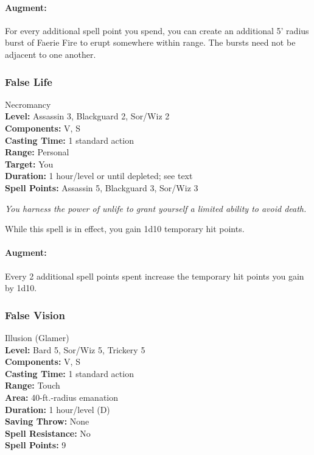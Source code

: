 \paragraph{Augment:} For every additional spell point you spend, you can create an additional 5' radius burst of Faerie Fire to erupt somewhere within range. The bursts need not be adjacent to one another.
\subsubsection{False Life}
\label{Spell:FalseLife}
Necromancy
\\ \textbf{Level:} Assassin 3, Blackguard 2, Sor/Wiz 2
\\ \textbf{Components:} V, S
\\ \textbf{Casting Time:} 1 standard action
\\ \textbf{Range:} Personal
\\ \textbf{Target:} You
\\ \textbf{Duration:} 1 hour/level or until depleted; see text
\\ \textbf{Spell Points:} Assassin 5, Blackguard 3, Sor/Wiz 3

\emph{You harness the power of unlife to grant yourself a limited ability to avoid death.} 

While this spell is in effect, you gain 1d10 temporary hit points.

\paragraph{Augment:} Every 2 additional spell points spent increase the temporary hit points you gain by 1d10.

\subsubsection{False Vision}
\label{Spell:FalseVision}
Illusion (Glamer)
\\ \textbf{Level:} Bard 5, Sor/Wiz 5, Trickery 5
\\ \textbf{Components:} V, S
\\ \textbf{Casting Time:} 1 standard action
\\ \textbf{Range:} Touch
\\ \textbf{Area:} 40-ft.-radius emanation
\\ \textbf{Duration:} 1 hour/level (D)
\\ \textbf{Saving Throw:} None
\\ \textbf{Spell Resistance:} No
\\ \textbf{Spell Points:} 9


